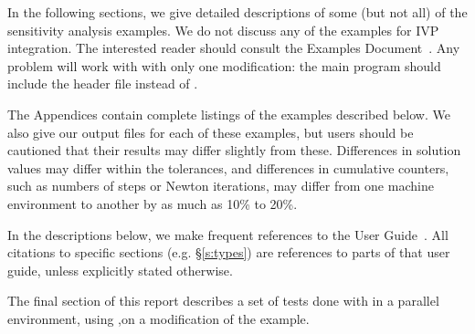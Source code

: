 \vspace{0.3in}
\noindent 
In the following sections, we give detailed descriptions of some (but
not all) of the sensitivity analysis examples. We do not discuss any of the 
examples for IVP integration. The interested reader should consult the
{\cvode} Examples Document~\cite{cvode2.2.0_ex}. Any {\cvode} problem
will work with {\cvodes} with only one modification: the main program
should include the header file  instead of .

The Appendices contain complete listings
of the examples described below.  We also give our output files for
each of these examples, but users should be cautioned that their
results may differ slightly from these.  Differences in solution
values may differ within the tolerances, and differences in cumulative
counters, such as numbers of steps or Newton iterations, may differ
from one machine environment to another by as much as 10\% to 20\%.

In the descriptions below, we make frequent references to the {\cvodes}
User Guide~\cite{cvodes2.1.0_ug}.  All citations to specific sections
(e.g. \S\ref{s:types}) are references to parts of that user guide, unless
explicitly stated otherwise.

The final section of this report describes a set of tests done with
{\cvodes} in a parallel environment, using {\nvecp},on a modification of
the  example.
